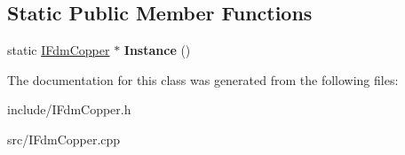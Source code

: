 \subsection*{Static Public Member Functions}
\begin{DoxyCompactItemize}
\item 
\hypertarget{class_f_d_m_1_1_i_fdm_copper_ad3344e5055c66ef46667462e1ad4206d}{}static \hyperlink{class_f_d_m_1_1_i_fdm_copper}{I\+Fdm\+Copper} $\ast$ {\bfseries Instance} ()\label{class_f_d_m_1_1_i_fdm_copper_ad3344e5055c66ef46667462e1ad4206d}

\end{DoxyCompactItemize}


The documentation for this class was generated from the following files\+:\begin{DoxyCompactItemize}
\item 
include/I\+Fdm\+Copper.\+h\item 
src/I\+Fdm\+Copper.\+cpp\end{DoxyCompactItemize}
